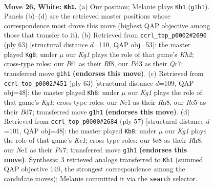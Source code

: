 \documentclass[11pt]{article}
\begin{document}
\clearpage

\begin{figure}[p]\centering
\begin{subfigure}{0.46\textwidth}\centering
\resizebox{\linewidth}{!}{%
\newchessgame
\chessboard[
  setfen={r1b4r/1pN3k1/1n6/2R3pp/1n1q4/1Q1P1P2/P7/4NBK1 w - - 1 26},
  showmover=false,
  pgfstyle=straightmove, color=movearrow, markmove={g1-h1}
]}
\caption{}
\end{subfigure}\hfill
\begin{subfigure}{0.46\textwidth}\centering
\resizebox{\linewidth}{!}{%
\newchessgame
\chessboard[
  setfen={5r2/2q2p1k/p1rR1p2/1p2bQ2/4N3/7P/PP4P1/3B3K b - - 1 32},
  showmover=false,
  pgfstyle=straightmove, color=movearrow, markmove={h7-g8}
]}
\caption{}
\end{subfigure}
\\[4pt]
\begin{subfigure}{0.46\textwidth}\centering
\resizebox{\linewidth}{!}{%
\newchessgame
\chessboard[
  setfen={r5k1/pp1bqn1p/4pN2/4P3/6p1/4Q2P/P5B1/5RK1 b - - 5 32},
  showmover=false,
  pgfstyle=straightmove, color=movearrow, markmove={g8-h8}
]}
\caption{}
\end{subfigure}\hfill
\begin{subfigure}{0.46\textwidth}\centering
\resizebox{\linewidth}{!}{%
\newchessgame
\chessboard[
  setfen={2k4r/pp2b1p1/3nBqp1/2p1Q3/5N1P/8/PP3P2/2KR4 b - - 6 29},
  showmover=false,
  pgfstyle=straightmove, color=movearrow, markmove={c8-b8}
]}
\caption{}
\end{subfigure}
\caption{\textbf{Move 26, White: \texttt{Kh1}.} (a) Our position; Melanie plays \texttt{Kh1} (\texttt{g1h1}). Panels (b)--(d) are the retrieved master positions whose correspondence most drove this move (highest QAP objective among those that transfer to it). (b) Retrieved from \texttt{ccrl\_top\_p0002\#2690} (ply 63) [structural distance $d$=110, QAP obj=53]: the master played \texttt{Kg8}; under $\mu$ our \emph{Kg1} plays the role of that game's \emph{Kh2}; cross-type roles: our \emph{B}f1 as their \emph{R}f8, our \emph{P}d3 as their \emph{Q}c7; transferred move \texttt{g1h1} \textbf{(endorses this move)}. (c) Retrieved from \texttt{ccrl\_top\_p0002\#451} (ply 63) [structural distance $d$=109, QAP obj=48]: the master played \texttt{Kh8}; under $\mu$ our \emph{Kg1} plays the role of that game's \emph{Kg1}; cross-type roles: our \emph{N}e1 as their \emph{R}a8, our \emph{R}c5 as their \emph{B}d7; transferred move \texttt{g1h1} \textbf{(endorses this move)}. (d) Retrieved from \texttt{ccrl\_top\_p0000\#2684} (ply 57) [structural distance $d$=101, QAP obj=48]: the master played \texttt{Kb8}; under $\mu$ our \emph{Kg1} plays the role of that game's \emph{Kc1}; cross-type roles: our \emph{b}c8 as their \emph{R}h8, our \emph{N}e1 as their \emph{P}a7; transferred move \texttt{g1h1} \textbf{(endorses this move)}. Synthesis: 3 retrieved analogs transferred to \texttt{Kh1} (summed QAP objective 149, the strongest correspondence among the candidate moves); Melanie committed it via the \texttt{search} selector.}
\label{fig:thought-m50}
\end{figure}
\end{document}
